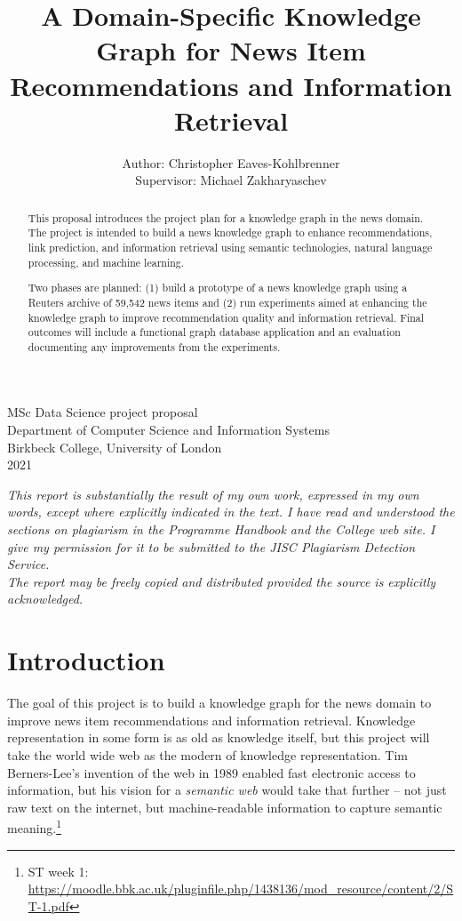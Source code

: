 \documentclass[11pt]{article}
\title{A Domain-Specific Knowledge Graph for News Item Recommendations and Information Retrieval}
\author{Author: Christopher Eaves-Kohlbrenner \\ Supervisor: Michael Zakharyaschev}
\begin{document}
\maketitle

\begin{center}
\hfill \break
\hfill \break
\hfill \break
MSc Data Science project proposal\\
Department of Computer Science and Information Systems\\
Birkbeck College, University of London\\
2021\\
\hfill \break
\hfill \break
\hfill \break

\textit{This report is substantially the result of my own work, expressed in my own words, except where explicitly indicated in the text. I have read and understood the sections on plagiarism in the Programme Handbook and the College web site. I give my permission for it to be submitted to the JISC Plagiarism Detection Service. \\
\hfill \break
The report may be freely copied and distributed provided the source is explicitly acknowledged.}
\end{center}


\newpage
\begin{abstract}
This proposal introduces the project plan for a knowledge graph in the news domain. The project is intended to build a news knowledge graph to enhance recommendations, link prediction, and information retrieval using semantic technologies, natural language processing, and machine learning.

Two phases are planned: (1) build a prototype of a news knowledge graph using a Reuters archive of 59,542 news items and (2) run experiments aimed at enhancing the knowledge graph to improve recommendation quality and information retrieval. Final outcomes will include a functional graph database application and an evaluation documenting any improvements from the experiments.
\end{abstract}

\newpage
\tableofcontents

\newpage
\section{Introduction}
The goal of this project is to build a knowledge graph for the news domain to improve news item recommendations and information retrieval. Knowledge representation in some form is as old as knowledge itself, but this project will take the world wide web as the modern of knowledge representation. Tim Berners-Lee's invention of the web in 1989 enabled fast electronic access to information, but his vision for a \textit{semantic web} would take that further -- not just raw text on the internet, but machine-readable information to capture semantic meaning.\footnote{ST week 1: \url{https://moodle.bbk.ac.uk/pluginfile.php/1438136/mod_resource/content/2/ST-1.pdf}}
\end{document}
